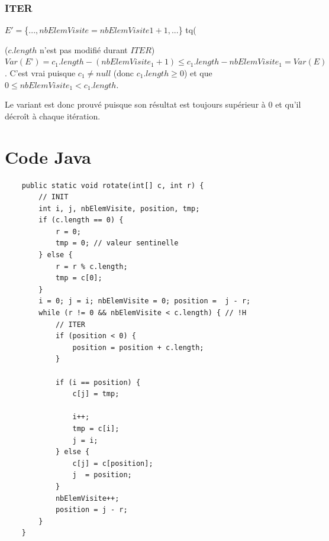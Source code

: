 	\subsubsection{ITER}	

	\begin{description}
		\item[$E' = $\{$..., nbElemVisite=nbElemVisite1+1,...$\} tq(] 
	\end{description}	



	($c.length$ n’est pas modifié durant $ITER$)\\
	$Var(E’)=c_1.length-(nbElemVisite_1+1) \leq c_1.length-nbElemVisite_1=Var(E)$.
	C’est vrai puisque $c_1 \neq null$ (donc $c_1.length \geq 0$) 
	et que $0 \leq nbElemVisite_1 < c_1.length$.
	
	Le variant est donc prouvé puisque son résultat est toujours supérieur à $0$ et qu’il décroît à chaque itération.


	\section{Code Java}
	
	\begin{lstlisting}
	public static void rotate(int[] c, int r) {
		// INIT
		int i, j, nbElemVisite, position, tmp;
		if (c.length == 0) {
			r = 0;
			tmp = 0; // valeur sentinelle
		} else {
			r = r % c.length;
			tmp = c[0];
		}
		i = 0; j = i; nbElemVisite = 0; position =  j - r;
		while (r != 0 && nbElemVisite < c.length) { // !H
			// ITER
			if (position < 0) {
				position = position + c.length;
			}
			
			if (i == position) {
				c[j] = tmp;
			
				i++;
				tmp = c[i];
				j = i;
			} else {
				c[j] = c[position];
				j  = position;
			}
			nbElemVisite++;
			position = j - r;
		}
	}
	\end{lstlisting}







				
